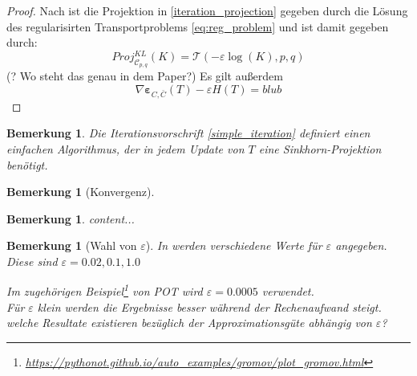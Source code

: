 \documentclass[twoside, 11pt,a4paper]{article}
\newtheorem{remark}[theorem]{Bemerkung}
\numberwithin{equation}{section}
\begin{document}
	\begin{proof}
		Nach \cite{iterative_bregman_projections} ist die Projektion in \ref{iteration_projection} gegeben durch die Lösung des regularisirten Transportproblems \ref{eq:reg_problem} und ist damit gegeben durch:
		\begin{equation}
		Proj_{\mathcal{C}_{p,q}}^{KL}(K) = \mathcal{T}(-\varepsilon \log (K), p, q)
		\end{equation}
		(? Wo steht das genau in dem Paper?)
		Es gilt außerdem
		\begin{equation}
		\nabla \boldsymbol{\varepsilon}_{C, \bar{C}}(T) -\varepsilon H(T) = blub
		\end{equation}
	\end{proof}
	
	\begin{remark}
		Die Iterationsvorschrift \ref{simple_iteration} definiert einen einfachen Algorithmus, der in jedem Update von $T$ eine Sinkhorn-Projektion benötigt.
	\end{remark}
	
	\begin{remark}[Konvergenz]
		
	\end{remark}
	
	
	
	\begin{remark}
		content...
	\end{remark}
	
	\begin{remark}[Wahl von $\varepsilon$]
		In \cite{cuturi2013sinkhorn} werden verschiedene Werte für $\varepsilon$ angegeben. Diese sind $\varepsilon = 0.02, 0.1, 1.0$
		
		Im zugehörigen Beispiel\footnote{\url{https://pythonot.github.io/auto_examples/gromov/plot_gromov.html}} von POT wird $\varepsilon = 0.0005$ verwendet. \\
		Für $\varepsilon$ klein werden die Ergebnisse besser während der Rechenaufwand steigt.\\
		welche Resultate existieren bezüglich der Approximationsgüte abhängig von $\varepsilon$?
	\end{remark}
\end{document}
